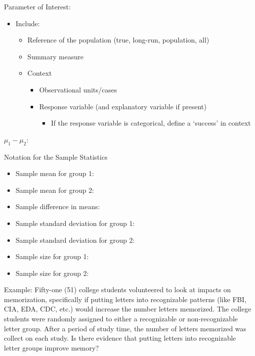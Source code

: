 \documentclass[
]{report}
\providecommand{\tightlist}{%
  \setlength{\itemsep}{0pt}\setlength{\parskip}{0pt}}
\begin{document}

Parameter of Interest:

\begin{itemize}
\item
  Include:

  \begin{itemize}
  \item
    Reference of the population (true, long-run, population, all)
  \item
    Summary measure
  \item
    Context

    \begin{itemize}
    \item
      Observational units/cases
    \item
      Response variable (and explanatory variable if present)

      \begin{itemize}
      \tightlist
      \item
        If the response variable is categorical, define a `success' in context
      \end{itemize}
    \end{itemize}
  \end{itemize}
\end{itemize}

\(\mu_1-\mu_2:\)

\vspace{0.5in}


Notation for the Sample Statistics

\begin{itemize}
\item
  Sample mean for group 1:
\item
  Sample mean for group 2:
\item
  Sample difference in means:
\item
  Sample standard deviation for group 1:
\item
  Sample standard deviation for group 2:
\item
  Sample size for group 1:
\item
  Sample size for group 2:
\end{itemize}


Example: Fifty-one (51) college students volunteered to look at impacts on memorization, specifically if putting letters into recognizable patterns (like FBI, CIA, EDA, CDC, etc.) would increase the number letters memorized. The college students were randomly assigned to either a recognizable or non-recognizable letter group. After a period of study time, the number of letters memorized was collect on each study. Is there evidence that putting letters into recognizable letter groups improve memory?
\end{document}
